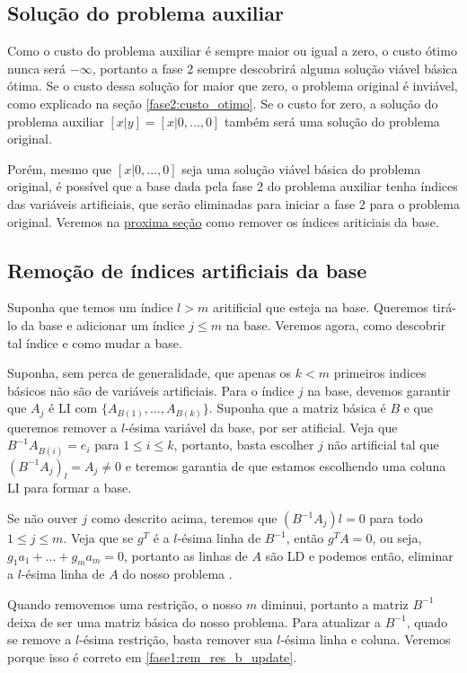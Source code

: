 \documentclass[12pt]{article}
\begin{document}
\subsection{Solução do problema auxiliar}
Como o custo do problema auxiliar é sempre maior ou igual a zero, o custo ótimo nunca será $-\infty$, portanto a fase 2 sempre descobrirá alguma solução viável básica ótima. Se o custo dessa solução for maior que zero, o problema original é inviável, como explicado na seção \ref{fase2:custo_otimo}. Se o custo for zero, a solução do problema auxiliar $[x|y] = [x | 0, ..., 0]$ também será uma solução do problema original. 

Porém, mesmo que $[x | 0, ..., 0]$ seja uma solução viável básica do problema original, é possível que a base dada pela fase 2 do problema auxiliar tenha índices das variáveis artificiais, que serão eliminadas para iniciar a fase 2 para o problema original. Veremos na \hyperref[rm_artificiais]{proxima seção} como remover os índices ariticiais da base.

\subsection{Remoção de índices artificiais da base}
\label{fase2:rm_artificiais}
Suponha que temos um índice $l > m$ aritificial que esteja na base. Queremos tirá-lo da base e adicionar um índice $j \leq m$ na base. Veremos agora, como descobrir tal índice e como mudar a base.

Suponha, sem perca de generalidade, que apenas os $k < m$ primeiros indices básicos não são de variáveis artificiais. Para o índice $j$ na base, devemos garantir que $A_{j}$ é LI com $\{A_{B(1)}, ..., A_{B(k)}\}$. Suponha que a matriz básica é $B$ e que queremos remover a $l$-ésima variável da base, por ser atificial. Veja que $B^{-1}A_{B(i)} = e_i$ para $1 \leq i \leq k$, portanto, basta escolher $j$ não artificial tal que $(B^{-1}A_j)_l = A_j  \neq 0$ e teremos garantia de que estamos escolhendo uma coluna LI para formar a base.

Se não ouver $j$ como descrito acima, teremos que $(B^{-1}A_j)l = 0$ para todo $1 \leq j \leq m$. Veja que se $g^T$ é a $l$-ésima linha de $B^{-1}$, então $g^TA = 0$, ou seja, $g_1a_1 + ... + g_ma_m = 0$, portanto as linhas de $A$ são LD e podemos então, eliminar a $l$-ésima linha de $A$ do nosso problema \cite{315book}. 

Quando removemos uma restrição, o nosso $m$ diminui, portanto a matriz $B^{-1}$ deixa de ser uma matriz básica do nosso problema. Para atualizar a $B^{-1}$, quado se remove a $l$-ésima restrição, basta remover sua $l$-ésima linha e coluna. Veremos porque isso é correto em \ref{fase1:rem_res_b_update}.
\end{document}
